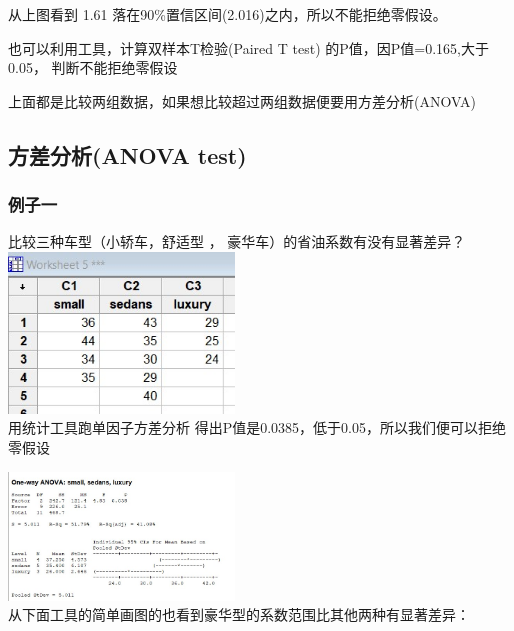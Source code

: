 从上图看到 1.61 落在90\%置信区间(2.016)之内，所以不能拒绝零假设。

也可以利用工具，计算双样本T检验(Paired T test)
的P值，因P值=0.165,大于0.05， 判断不能拒绝零假设

上面都是比较两组数据，如果想比较超过两组数据便要用方差分析(ANOVA)

\hypertarget{ux65b9ux5deeux5206ux67901-anova-test}{%
\subsection{方差分析(ANOVA
test)}\label{ux65b9ux5deeux5206ux67901-anova-test}}

\hypertarget{ux65b9ux5deeux5206ux67902-anova-test}{%
\subsubsection{例子一}\label{ux65b9ux5deeux5206ux67902-anova-test}}

比较三种车型（小轿车，舒适型 ， 豪华车）的省油系数有没有显著差异？\\
\includegraphics[width=6cm]{5anovaDataScreenshot_2022-07-24_105955.jpg}\\
用统计工具跑单因子方差分析
得出P值是0.0385，低于0.05，所以我们便可以拒绝零假设 


\includegraphics[width=6cm]{5anovaResultScreenshot_2022-07-24_104352.jpg}\\
从下面工具的简单画图的也看到豪华型的系数范围比其他两种有显著差异：

